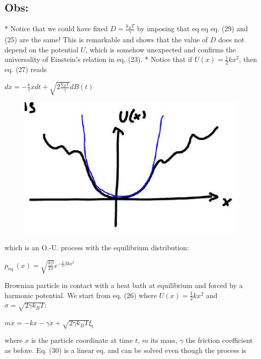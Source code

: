 \subsection*{Obs:}
    * Notice that we could have fixed $D=\frac{k_{B} T}{\gamma}$ by imposing that
eq eq eq. (29) and (25) are the same! This is remarkable and shows that the value of
$D$ does not depend on the potential $U$, which is somehow unexpected and
confirms the universality of Einstein's relation in eq. (23).
    * Notice that if $U(x)=\frac{1}{2} k x^{2}$, then eq. (27) reads
\begin{DispWithArrows}[displaystyle, format=c]
  $d x=-\frac{k}{\gamma} x d t+\sqrt{2 \frac{k_{B} T}{\gamma}} d B(t)$
\end{DispWithArrows}
\begin{figure}[htbp]
  \centering
  \includegraphics[width=\textwidth]{graphics/2025_10_17_15d569b79a40ed74679eg-15}
\end{figure}
which is an O.-U. process with the equilibrium distribution:
\begin{DispWithArrows}[displaystyle, format=c]
  $p_{\text {eq }}(x)=\sqrt{\frac{k \beta}{2 \pi}} e^{-\frac{1}{2} \beta k x^{2}}$
\end{DispWithArrows}
Brownian particle in contact with a heat bath at equilibrium and forced by a
harmonic potential. We start from eq. (26) where $U(x)=\frac{1}{2} k x^{2}$
and $\sigma=\sqrt{2 \gamma k_{B} T}$:
\begin{DispWithArrows}[displaystyle, format=c]
  $m \ddot{x}=-k x-\gamma \dot{x}+\sqrt{2 \gamma k_{B} T} \xi_{t}$
\end{DispWithArrows}
where $x$ is the particle coordinate at time $t$, $m$ its mass, $\gamma$ the
friction coefficient as before.
Eq. (30) is a linear eq. and can be solved even though the process is
